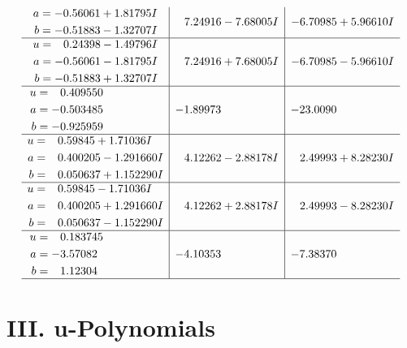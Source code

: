\documentclass[1p]{elsarticle_modified}
\theoremstyle{definition}
\begin{document}
$$\begin{array}{c|c|c}
\begin{aligned}
a &= -0.56061 + 1.81795 I \\
b &= -0.51883 - 1.32707 I\end{aligned}
 & \phantom{-}7.24916 - 7.68005 I & -6.70985 + 5.96610 I \\ \hline\begin{aligned}
u &= \phantom{-}0.24398 - 1.49796 I \\
a &= -0.56061 - 1.81795 I \\
b &= -0.51883 + 1.32707 I\end{aligned}
 & \phantom{-}7.24916 + 7.68005 I & -6.70985 - 5.96610 I \\ \hline\begin{aligned}
u &= \phantom{-}0.409550\phantom{ +0.000000I} \\
a &= -0.503485\phantom{ +0.000000I} \\
b &= -0.925959\phantom{ +0.000000I}\end{aligned}
 & -1.89973\phantom{ +0.000000I} & -23.0090\phantom{ +0.000000I} \\ \hline\begin{aligned}
u &= \phantom{-}0.59845 + 1.71036 I \\
a &= \phantom{-}0.400205 - 1.291660 I \\
b &= \phantom{-}0.050637 + 1.152290 I\end{aligned}
 & \phantom{-}4.12262 - 2.88178 I & \phantom{-}2.49993 + 8.28230 I \\ \hline\begin{aligned}
u &= \phantom{-}0.59845 - 1.71036 I \\
a &= \phantom{-}0.400205 + 1.291660 I \\
b &= \phantom{-}0.050637 - 1.152290 I\end{aligned}
 & \phantom{-}4.12262 + 2.88178 I & \phantom{-}2.49993 - 8.28230 I \\ \hline\begin{aligned}
u &= \phantom{-}0.183745\phantom{ +0.000000I} \\
a &= -3.57082\phantom{ +0.000000I} \\
b &= \phantom{-}1.12304\phantom{ +0.000000I}\end{aligned}
 & -4.10353\phantom{ +0.000000I} & -7.38370\phantom{ +0.000000I}\\
 \hline 
 \end{array}$$\newpage
\newpage\renewcommand{\arraystretch}{1}
\centering \section*{ III. u-Polynomials}
\end{document}

